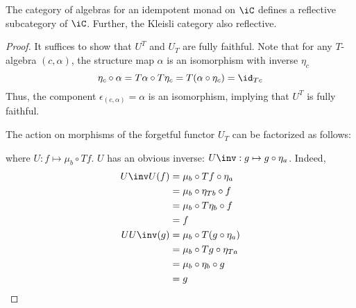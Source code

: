 \documentclass{amsart}
\begin{document}
\begin{lem}
  The category of algebras for an idempotent monad on $\iC$ defines a reflective subcategory of $\iC$.
  Further, the Kleisli category also reflective.
\end{lem}
\begin{proof}
  It suffices to show that $U^{T}$ and $U_{T}$ are fully faithful.
  Note that for any $T$-algebra $(c, \alpha)$, the structure map $\alpha$ is an isomorphism with inverse $\eta_{c}$
  \[
    \eta_{c} \circ \alpha = T\alpha \circ T\eta_{c} = T(\alpha \circ \eta_{c}) = \id_{Tc}
  \]
  Thus, the component $\epsilon_{(c,\alpha)} = \alpha$ is an isomorphism, implying that $U^{T}$ is fully faithful.

  The action on morphisms of the forgetful functor $U_{T}$ can be factorized as follows:
  
  where $U : f \mapsto \mu_{b} \circ Tf$.
  $U$ has an obvious inverse: $U\inv : g \mapsto g \circ \eta_{a}$.
  Indeed,
  \begin{align}
    U\inv U(f) &= \mu_{b} \circ Tf \circ \eta_{a}\\
               &= \mu_{b} \circ \eta_{Tb} \circ f\\
               &= \mu_{b} \circ T\eta_{b} \circ f\\
               &= f\\
    UU\inv(g) &= \mu_{b} \circ T(g \circ \eta_{a})\\
               &= \mu_{b} \circ Tg \circ \eta_{Ta}\\
               &= \mu_{b} \circ \eta_{b} \circ g\\
               &= g
  \end{align}
\end{proof}



\end{document}
